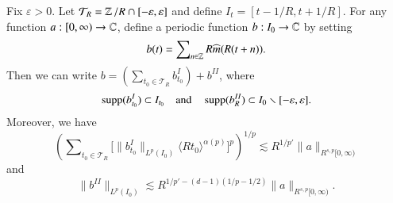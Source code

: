 \begin{lemma} \label{decompositionLemma}
    Fix $\varepsilon > 0$. Let $\mathcal{T}_R = \operatorname{\mathbb{Z}}/R \cap [-\varepsilon, \varepsilon]$ and define $I_t = [t - 1/R, t + 1/R]$. For any function $a: [0,\infty) \to \operatorname{\mathbb{C}}$, define a periodic function $b: I_0 \to \operatorname{\mathbb{C}}$ by setting
    \[ b(t) = \sum\nolimits_{n \in \operatorname{\mathbb{Z}}} R \widehat{m}(R(t + n)). \]
    Then we can write $b = \left( \sum\nolimits_{t_0 \in \mathcal{T}_R} b_{t_0}^I \right) + b^{II}$, where
    \[ \operatorname{\text{supp}}(b_{t_0}^I) \subset I_{t_0} \quad\text{and}\quad \operatorname{\text{supp}}(b_R^{II}) \subset I_0 \smallsetminus [-\varepsilon,\varepsilon]. \]
    Moreover, we have
    \[ \left( \sum\nolimits_{t_0 \in \mathcal{T}_R} \Big[ \| b^I_{t_0} \|_{L^p(I_0)} \langle R t_0 \rangle^{\alpha(p)} \Big]^p \right)^{1/p} \lesssim R^{1/p'} \| a \|_{R^{s,p}[0,\infty)} \]
        and
    \[ \| b^{II} \|_{L^p(I_0)} \lesssim R^{1/p' - (d-1)(1/p - 1/2)} \| a \|_{R^{s,p}[0,\infty)}. \]
\end{lemma}
